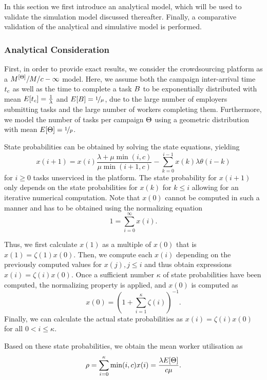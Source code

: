 In this section we first introduce an analytical model, which will be used to validate the simulation model discussed thereafter.
Finally, a comparative validation of the analytical and simulative model is performed.

\subsubsection*{Analytical Consideration}

First, in order to provide exact results, we consider the crowdsourcing platform as a \(M^{[\Theta]}/M/c-\infty\) model.
Here, we assume both the campaign inter-arrival time \(t_c\) as well as the time to complete a task \(B\) to be exponentially distributed with mean \(E[t_c] = \frac{1}{\lambda}\) and \(E[B] = \nicefrac{1}{\mu}\), due to the large number of employers submitting tasks and the large number of workers completing them.
Furthermore, we model the number of tasks per campaign \(\Theta\) using a geometric distribution with mean \(E[\Theta] = \nicefrac{1}{p}\).

State probabilities\cite{Kleinrock1975} can be obtained by solving the state equations, yielding
\[
x(i + 1) = x(i) \frac{\lambda + \mu \min(i, c)}{\mu \min(i + 1, c)} - \sum_{k=0}^{i-1} x(k) \lambda \theta(i - k)
\]
for \(i \geq 0\) tasks unserviced in the platform.
The state probability for \(x(i+1)\) only depends on the state probabilities for \(x(k)\) for \(k \leq i\) allowing for an iterative numerical computation.
Note that \(x(0)\) cannot be computed in such a manner and has to be obtained using the normalizing equation 
\[
1 = \sum_{i=0}^{\infty} x(i).
\]

Thus, we first calculate \(x(1)\) as a multiple of \(x(0)\) that is \(x(1) = \zeta(1) x(0)\).
Then, we compute each \(x(i)\) depending on the previously computed values for \(x(j), j \leq i\) and thus obtain expressions \(x(i) = \zeta(i) x(0)\).  
Once a sufficient number \(\kappa\) of state probabilities have been computed, the normalizing property is applied, and \(x(0)\) is computed as
\[
	x(0) = \left(1 + \sum_{i = 1}^\kappa \zeta(i)\right)^{-1}.
\]
Finally, we can calculate the actual state probabilities as \(x(i) = \zeta(i) x(0)\) for all \(0 < i \leq \kappa\).

Based on these state probabilities, we obtain the mean worker utilisation \workerUtilization as
\[
\rho = \sum_{i=0}^{\kappa} \min(i, c) x(i) = \frac{\lambda E[\Theta]}{c\mu}. 
\]

